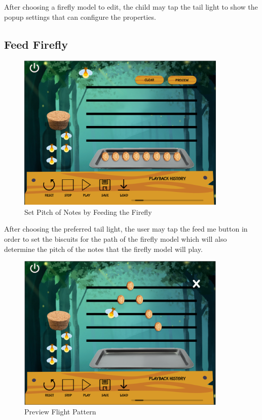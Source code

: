 After choosing a firefly model to edit, the child may tap the tail light to show the popup settings that can configure the properties.

\subsection{Feed Firefly}

\begin{figure}[H]
    \centering
    \includegraphics[width=10cm]{figures/FeedFirefly.png}
    \caption{Set Pitch of Notes by Feeding the Firefly}
    \label{fig:feedfirefly}
\end{figure}

After choosing the preferred tail light, the user may tap the feed me button in order to set the biscuits for the path of the firefly model which will also determine the pitch of the notes that the firefly model will play.

\begin{figure}[H]
    \centering
    \includegraphics[width=10cm]{figures/PreviewEatingTrail.png}
    \caption{Preview Flight Pattern}
    \label{fig:previewFLight}
\end{figure}

